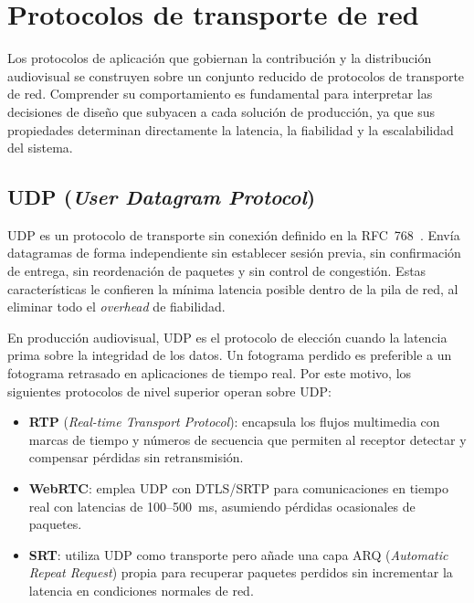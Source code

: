 \section{Protocolos de transporte de red}
\label{sec:protocolos_red}

Los protocolos de aplicación que gobiernan la contribución y la distribución audiovisual
se construyen sobre un conjunto reducido de protocolos de transporte de red. Comprender
su comportamiento es fundamental para interpretar las decisiones de diseño que subyacen
a cada solución de producción, ya que sus propiedades determinan directamente la latencia,
la fiabilidad y la escalabilidad del sistema.

\subsection{UDP (\textit{User Datagram Protocol})}

UDP es un protocolo de transporte sin conexión definido en la RFC~768~\cite{rfc768_udp}.
Envía datagramas de forma independiente sin establecer sesión previa, sin confirmación de
entrega, sin reordenación de paquetes y sin control de congestión. Estas características
le confieren la mínima latencia posible dentro de la pila de red, al eliminar todo el
\textit{overhead} de fiabilidad.

En producción audiovisual, UDP es el protocolo de elección cuando la latencia prima sobre
la integridad de los datos. Un fotograma perdido es preferible a un fotograma retrasado en
aplicaciones de tiempo real. Por este motivo, los siguientes protocolos de nivel superior
operan sobre UDP:

\begin{itemize}
  \item \textbf{RTP} (\textit{Real-time Transport Protocol}): encapsula los flujos
        multimedia con marcas de tiempo y números de secuencia que permiten al receptor
        detectar y compensar pérdidas sin retransmisión.
  \item \textbf{WebRTC}: emplea UDP con DTLS/SRTP para comunicaciones en tiempo real
        con latencias de 100--500~ms, asumiendo pérdidas ocasionales de paquetes.
  \item \textbf{SRT}: utiliza UDP como transporte pero añade una capa ARQ
        (\textit{Automatic Repeat Request}) propia para recuperar paquetes perdidos
        sin incrementar la latencia en condiciones normales de red.
\end{itemize}

